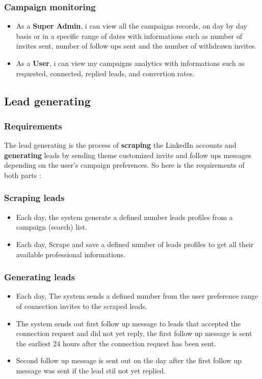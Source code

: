 \subsubsection{Campaign monitoring}
\begin{itemize}
  \item As a \textbf{Super Admin}, i can view all the campaigns records, on day by day basis or in a specific range of dates with informations such as number of invites sent, number of follow ups sent and the number of withdrawn invites.
  \item As a \textbf{User}, i can view my campaigns analytics with informations such as requested, connected, replied leads, and convertion rates.
\end{itemize}
\subsection{Lead generating}
\subsubsection{Requirements}
The lead generating is the process of \textbf{scraping} the LinkedIn accounts and \textbf{generating} leads by sending theme customized invite and follow ups messages depending on the user's campaign preferences. So here is the requirements of both parts :
\subsubsection{Scraping leads}
\begin{itemize}
  \item Each day, the system generate a defined number leads profiles from a campaign (search) list.
  \item Each day, Scrape and save a defined number of leads profiles to get all their available professional informations.
\end{itemize}
\subsubsection{Generating leads}
\begin{itemize}
  \item Each day, The system sends a defined number from the user preference range of connection invites to the scraped leads. 
  \item The system sends out first follow up message to leads that accepted the connection request and did not yet reply, the first follow up message is sent the earliest 24 hours after the connection request has been sent.
  \item Second follow up message is sent out on the day after the first follow up message was sent if the lead stil not yet replied. 
\end{itemize}

